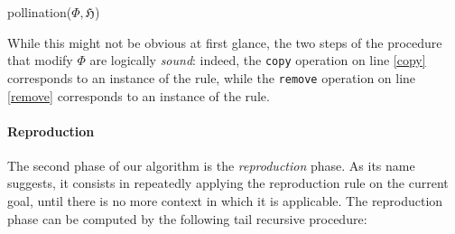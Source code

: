 \begin{procedure}[H]
  \caption{pollination($\Phi, \mathfrak{H}$)}
  \BlankLine

\end{procedure}

While this might not be obvious at first glance, the two steps of the
 procedure that modify $\Phi$ are logically
\emph{sound}: indeed, the \texttt{copy} operation on line \ref{copy} corresponds
to an instance of the  rule, while the \texttt{remove} operation
on line \ref{remove} corresponds to an instance of the  rule.

\paragraph{Reproduction}

The second phase of our algorithm is the \emph{reproduction} phase. As its name
suggests, it consists in repeatedly applying the reproduction rule  on
the current goal, until there is no more context in which it is
applicable. The reproduction phase can be computed by the following tail
recursive procedure:


